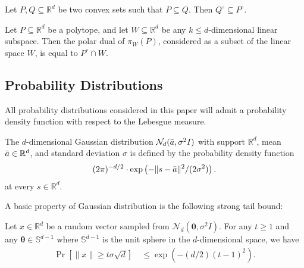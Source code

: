 \documentclass{article}\usepackage[a4paper,margin=20mm]{geometry}
\newcommand{\R}{\mathbb R}
\renewcommand{\subset}{\subseteq}
\begin{document}
\begin{fact}\label{fact:dual-containing}
    Let $P, Q \subset \R^d$ be two convex sets such that $P \subseteq Q$. Then $Q^\circ \subseteq P^\circ$.
\end{fact}

\begin{fact}\label{fact:dual-intersection}
    Let $P \subset \R^d$ be a polytope, and let $W \subset \R^d$ be any $k \leq d$-dimensional linear subspace. Then the polar dual of $\pi_W(P)$, considered as a subset of the linear space $W$, is equal to $P^\circ \cap W$.
\end{fact}


\subsection{Probability Distributions}\label{sec:laplace-gaussian}
All probability distributions considered in this paper will admit a probability density
function with respect to the Lebesgue measure.

\begin{definition}
    The $d$-dimensional Gaussian distribution $\mathcal{N}_d(\Bar{a}, \sigma^2I)$ with support $\R^d$, mean $\Bar{a}\in \R^d$, and standard deviation $\sigma$ is defined by the probability density function
    \begin{align*}
        (2\pi)^{-d/2} \cdot \exp\left(-\|s - \Bar{a}\|^2 / (2\sigma^2) \right).
    \end{align*}
    at every $s \in \R^d$.
\end{definition}

A basic property of Gaussian distribution is the following strong tail bound:
\begin{lemma}\label{lem:gaussian-tail}
    Let $x \in \R^d$ be a random vector sampled from $\mathcal{N}_d(\mathbf{0}, \sigma^2 I)$.
    For any $t\geq 1$ and any $\mathbf{\theta}\in \mathbb{S}^{d-1}$ where $\mathbb{S}^{d-1}$ is the unit sphere in the $d$-dimensional space, we have
        \begin{align*}
            \Pr[\|x\| \geq t\sigma \sqrt{d}] & ~ \leq \exp(-(d/2)(t-1)^2).
        \end{align*}
\end{lemma}
\end{document}
